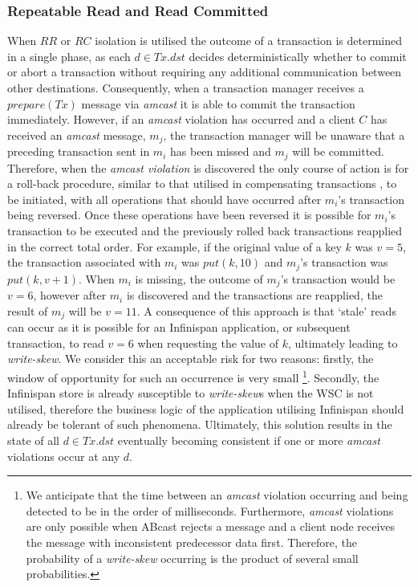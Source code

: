     \subsubsection*{Repeatable Read and Read Committed}
    When $RR$ or $RC$ isolation is utilised the outcome of a transaction is determined in a single phase, as each $d \in Tx.dst$ decides deterministically whether to commit or abort a transaction without requiring any additional communication between other destinations.  Consequently, when a transaction manager receives a $prepare(Tx)$ message via \emph{amcast} it is able to commit the transaction immediately.  However, if an \emph{amcast} violation has occurred and a client $C$ has received an \emph{amcast} message, $m_j$, the transaction manager will be unaware that a preceding transaction sent in $m_i$ has been missed and $m_j$ will be committed.  Therefore, when the \emph{amcast violation} is discovered the only course of action is for a roll-back procedure, similar to that utilised in compensating transactions \citep{Korth:1990:FAR:645916.671971}, to be initiated, with all operations that should have occurred after $m_i$'s transaction being reversed.  Once these operations have been reversed it is possible for $m_i$'s transaction to be executed and the previously rolled back transactions reapplied in the correct total order.  For example, if the original value of a key $k$ was $v=5$, the transaction associated with $m_i$ was $put(k, 10)$ and $m_j$'s transaction was $put(k, v+1)$.  When $m_i$ is missing, the outcome of $m_j$'s transaction would be $v = 6$, however after $m_i$ is discovered and the transactions are reapplied, the result of $m_j$ will be $v = 11$.  A consequence of this approach is that \textquoteleft{}stale' reads can occur as it is possible for an Infinispan application, or subsequent transaction, to read $v = 6$ when requesting the value of $k$, ultimately leading to \emph{write-skew}.  We consider this an acceptable risk for two reasons: firstly, the window of opportunity for such an occurrence is very small \footnote{We anticipate that the time between an \emph{amcast} violation occurring and being detected to be in the order of milliseconds.  Furthermore, \emph{amcast} violations are only possible when \textsf{ABcast} rejects a message and a client node receives the message with inconsistent predecessor data first.  Therefore, the probability of a \emph{write-skew} occurring is the product of several small probabilities.}.  Secondly, the Infinispan store is already susceptible to \emph{write-skew}s when the WSC is not utilised, therefore the business logic of the application utilising Infinispan should already be tolerant of such phenomena.  Ultimately, this solution results in the state of all $d \in Tx.dst$ eventually becoming consistent if one or more \emph{amcast} violations occur at any $d$.  
    
